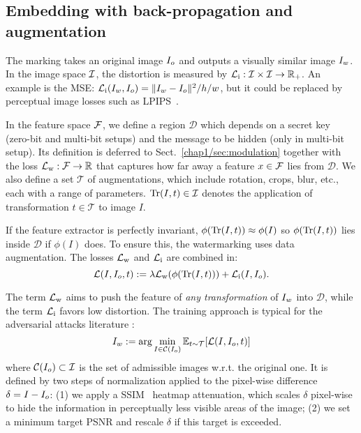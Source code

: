 \subsection{Embedding with back-propagation and augmentation}\label{chap1/subsec:embedding_algorithm}


The marking takes an original image $I_o$ and outputs a visually similar image $I_w$.
In the image space $\mathcal{I}$, the distortion is measured by $\mathcal{L}_{\mathrm{i}}:\mathcal{I}\times\mathcal{I}\to\mathbb{R}_+$. An example is the MSE:
$\mathcal{L}_{\mathrm{i}}(I_w,I_o) = \|I_w-I_o\|^2 / h/w$, but it could be replaced by perceptual image losses such as LPIPS~\citep{zhang2018unreasonable}.

In the feature space $\mathcal{F}$, we define a region $\mathcal{D}$ which depends on a secret key (zero-bit and multi-bit setups) and the message to be hidden (only in multi-bit setup). 
Its definition is deferred to Sect.~\ref{chap1/sec:modulation} together with the loss $\mathcal{L}_{\mathrm{w}}:\mathcal{F}\to\mathbb{R}$ that captures how far away a feature $x\in\mathcal{F}$ lies from $\mathcal{D}$. %
We also define a set $\mathcal T$ of augmentations, which include rotation, crops, blur, etc., each with a range of parameters.
$\mathrm{Tr}(I,t)\in\mathcal{I}$ denotes the application of transformation $t\in\mathcal T$ to image $I$.

If the feature extractor is perfectly invariant, $\phi(\mathrm{Tr}(I,t)) \approx \phi(I) $ so $\phi(\mathrm{Tr}(I,t))$ lies inside $\mathcal{D}$ if $\phi(I)$ does. 
To ensure this, the watermarking uses data augmentation.
The losses $\mathcal{L}_{\mathrm{w}}$ and $\mathcal{L}_{\mathrm{i}}$ are combined in:
\begin{equation}
\label{chap1/eq:global_loss}
    \mathcal{L}(I, I_o, t) := \lambda \mathcal{L}_{\mathrm{w}}(\phi(\mathrm{Tr}(I,t))) + \mathcal{L}_{\mathrm{i}}(I,I_o).
\end{equation}

The term $\mathcal{L}_{\mathrm{w}}$ aims to push the feature of \emph{any transformation} of $I_w$ into $\mathcal D$, while the
term $\mathcal{L}_{\mathrm{i}}$ favors low distortion.
The training approach is typical for the adversarial attacks literature \citep{goodfellow2014adversarial, szegedy2013intriguing}: 
\begin{equation}
\label{chap1/eq:Watermarking}
    I_w := \arg \min_{I\in \mathcal{C}(I_o)}
    \mathbb{E}_{t\sim \mathcal T} [\mathcal{L}(I, I_o, t)]
\end{equation}
where $\mathcal{C}(I_o)\subset\mathcal{I}$ is the set of admissible images w.r.t. the original one. 
It is defined by two steps of normalization applied to the pixel-wise difference $\delta = I - I_o$:
(1) we apply a SSIM~\citep{wang2004ssim} heatmap attenuation, which scales $\delta$ pixel-wise to hide the information in perceptually less visible areas of the image;
(2) we set a minimum target PSNR and rescale $\delta$ if this target is exceeded.


